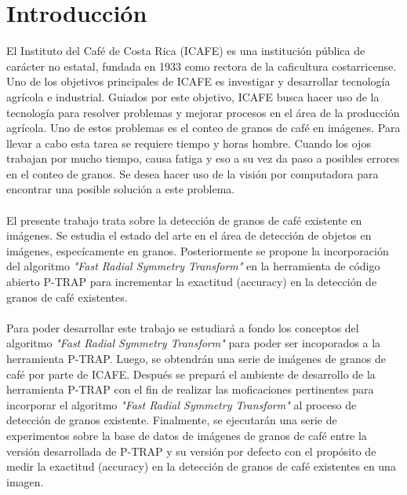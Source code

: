 \section{\textbf{Introducci\'on}}\label{introduccion}
El Instituto del Caf\'e de Costa Rica (ICAFE) es una instituci\'on p\'ublica de car\'acter no estatal, fundada en 1933 como rectora de la caficultura costarricense. Uno de los objetivos principales de ICAFE es investigar y desarrollar tecnolog\'ia agr\'icola e industrial. Guiados por este objetivo, ICAFE busca hacer uso de la tecnolog\'ia para resolver problemas y mejorar procesos en el \'area de la producci\'on agr\'icola. Uno de estos problemas es el conteo de granos de caf\'e en im\'agenes. Para llevar a cabo esta tarea se requiere tiempo y horas hombre. Cuando los ojos trabajan por mucho tiempo, causa fatiga y eso a su vez da paso a posibles errores en el conteo de granos. Se desea hacer uso de la visi\'on por computadora para encontrar una posible soluci\'on a este problema.
\\\\
El presente trabajo trata sobre la detecci\'on de granos de caf\'e existente en im\'agenes.
Se estudia el estado del arte en el \'area de detecci\'on de objetos en im\'agenes,
espec\'icamente en granos. Posteriormente se propone la incorporaci\'on del algoritmo
\textit{"Fast Radial Symmetry Transform"}\cite{loyzelinsky} en la herramienta de c\'odigo abierto P-TRAP\cite{ptrap} para incrementar la exactitud (accuracy) en la detecci\'on de granos de caf\'e existentes.
\\\\
Para poder desarrollar este trabajo se estudiar\'a a fondo los conceptos del algoritmo \textit{"Fast Radial Symmetry Transform"}\cite{loyzelinsky} para poder ser incoporados a la herramienta P-TRAP\cite{ptrap}.
Luego, se obtendr\'an una serie de im\'agenes de granos de caf\'e por parte de ICAFE. Despu\'es se prepar\'a el ambiente de desarrollo de la herramienta P-TRAP\cite{ptrap} con el fin de realizar las moficaciones pertinentes para incorporar el algoritmo \textit{"Fast Radial Symmetry Transform"}\cite{loyzelinsky} al proceso de detecci\'on de granos existente. Finalmente, se ejecutar\'an una serie de experimentos sobre la base de datos de im\'agenes de granos de caf\'e entre la versi\'on desarrollada de P-TRAP\cite{ptrap} y su versi\'on por defecto con el prop\'osito de medir la exactitud (accuracy) en la detecci\'on de granos de caf\'e existentes en una imagen.
\\\\
